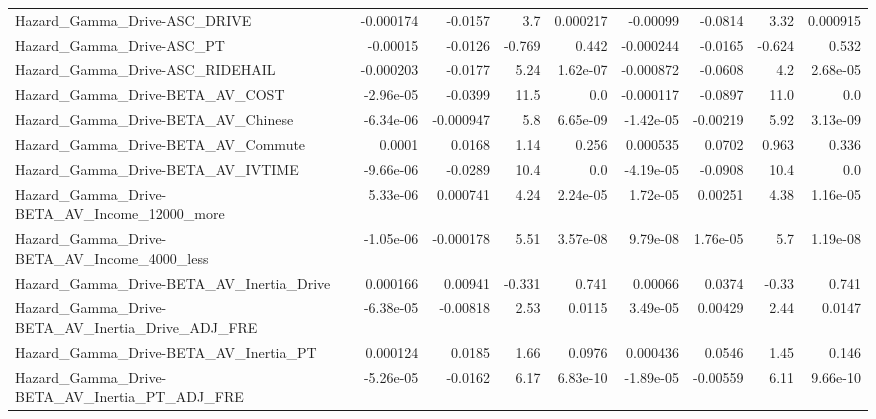 \begin{tabular}{lrrrrrrrr}
Hazard\_Gamma\_Drive-ASC\_DRIVE                       &   -0.000174 &      -0.0157 &      3.7 & 0.000217 &   -0.00099 &     -0.0814 &         3.32 &      0.000915 \\
Hazard\_Gamma\_Drive-ASC\_PT                          &    -0.00015 &      -0.0126 &   -0.769 &    0.442 &  -0.000244 &     -0.0165 &       -0.624 &         0.532 \\
Hazard\_Gamma\_Drive-ASC\_RIDEHAIL                    &   -0.000203 &      -0.0177 &     5.24 & 1.62e-07 &  -0.000872 &     -0.0608 &          4.2 &      2.68e-05 \\
Hazard\_Gamma\_Drive-BETA\_AV\_COST                    &   -2.96e-05 &      -0.0399 &     11.5 &      0.0 &  -0.000117 &     -0.0897 &         11.0 &           0.0 \\
Hazard\_Gamma\_Drive-BETA\_AV\_Chinese                 &   -6.34e-06 &    -0.000947 &      5.8 & 6.65e-09 &  -1.42e-05 &    -0.00219 &         5.92 &      3.13e-09 \\
Hazard\_Gamma\_Drive-BETA\_AV\_Commute                 &      0.0001 &       0.0168 &     1.14 &    0.256 &   0.000535 &      0.0702 &        0.963 &         0.336 \\
Hazard\_Gamma\_Drive-BETA\_AV\_IVTIME                  &   -9.66e-06 &      -0.0289 &     10.4 &      0.0 &  -4.19e-05 &     -0.0908 &         10.4 &           0.0 \\
Hazard\_Gamma\_Drive-BETA\_AV\_Income\_12000\_more       &    5.33e-06 &     0.000741 &     4.24 & 2.24e-05 &   1.72e-05 &     0.00251 &         4.38 &      1.16e-05 \\
Hazard\_Gamma\_Drive-BETA\_AV\_Income\_4000\_less        &   -1.05e-06 &    -0.000178 &     5.51 & 3.57e-08 &   9.79e-08 &    1.76e-05 &          5.7 &      1.19e-08 \\
Hazard\_Gamma\_Drive-BETA\_AV\_Inertia\_Drive           &    0.000166 &      0.00941 &   -0.331 &    0.741 &    0.00066 &      0.0374 &        -0.33 &         0.741 \\
Hazard\_Gamma\_Drive-BETA\_AV\_Inertia\_Drive\_ADJ\_FRE   &   -6.38e-05 &     -0.00818 &     2.53 &   0.0115 &   3.49e-05 &     0.00429 &         2.44 &        0.0147 \\
Hazard\_Gamma\_Drive-BETA\_AV\_Inertia\_PT              &    0.000124 &       0.0185 &     1.66 &   0.0976 &   0.000436 &      0.0546 &         1.45 &         0.146 \\
Hazard\_Gamma\_Drive-BETA\_AV\_Inertia\_PT\_ADJ\_FRE      &   -5.26e-05 &      -0.0162 &     6.17 & 6.83e-10 &  -1.89e-05 &    -0.00559 &         6.11 &      9.66e-10 \\

\end{tabular}
